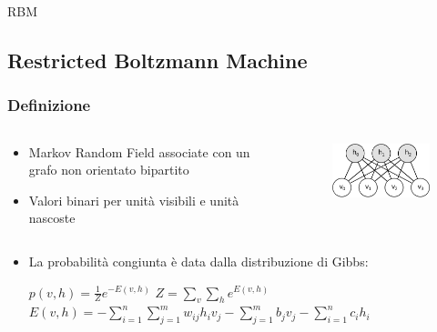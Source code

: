 \documentclass{beamer}
\begin{document}
\begin{section}{RBM}
\subsection{Restricted Boltzmann Machine}
\begin{frame}
\frametitle{Definizione}
\begin{columns}
\begin{column}{6cm}
\begin{itemize}
\item Markov Random Field associate con un grafo non orientato bipartito
\item Valori binari per unit\`{a} visibili e unit\`{a} nascoste
\end{itemize}
\end{column}
\begin{column}{4cm}
\begin{figure}
\centering
\includegraphics[width=1\linewidth]{./img/rbm}
\label{fig:rbm}
\end{figure}
\end{column}
\end{columns}
\begin{itemize}
\item La probabilit\`{a} congiunta \`{e} data dalla distribuzione di Gibbs:
\begin{center}
$ p(v,h) = \frac{1}{Z}e^{-E(v,h)} $\newline
$ Z = \sum_{v} \sum_{h}e^{E(v,h)} $ \newline
$ E(v,h) = -\sum_{i=1}^{n}\sum_{j=1}^{m}w_{ij}h_{i}v_{j} -\sum_{j=1}^{m}b_{j}v_{j} - \sum_{i=1}^{n}c_{i}h_{i} $
\end{center}
\end{itemize}
\end{frame}


\end{section}
\end{document}
